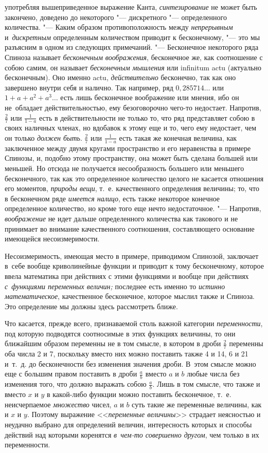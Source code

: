 употребляя вышеприведенное выражение Канта, {\em синтезирование} не может быть
закончено, доведено до некоторого "--- дискретного "--- определенного
количества. "--- Каким образом противоположность между {\em непрерывным}
и~{\em дискретным} определенным количеством приводит к бесконечному, "--- это
мы разъясним в одном из следующих примечаний. "--- Бесконечное некоторого ряда
Спиноза называет {\em бесконечным воображения}, бесконечное же, как соотношение
с собою самим, он называет {\em бесконечным мышления} или infinitum actu
(актуально бесконечным). Оно именно actu, {\em действительно} бесконечно, так
как оно завершено внутри себя и налично. Так например, ряд $0{,}285714\ldots$
или $1+a+a^2+a^3\ldots$ есть лишь бесконечное воображение или мнения, ибо он
не~обладает действительностью, ему безоговорочно чего-то недостает. Напротив,
$\frac 2 7$ или $\frac 1{1-a}$ есть в действительности не только то, что ряд
представляет собою в своих наличных членах, но вдобавок к этому еще и то, чего
ему недостает, чем он только {\em должен быть}. $\frac 2 7$ или $\frac 1{1-a}$
есть такая же конечная величина, как заключенное между двумя кругами
пространство и его неравенства в примере Спинозы, и, подобно этому
пространству, она может быть сделана большей или меньшей. Но отсюда не
получается несообразность большего или меньшего бесконечного, так как это
определенное количество целого не касается отношения его моментов, {\em природы
вещи}, т.~е. качественного определения величины; то, что в бесконечном ряде
{\em имеется налицо}, есть также некоторое конечное определенное количество,
но кроме того еще нечто недостаточное. "--- Напротив, {\em воображение} не идет
дальше определенного количества как такового и не принимает во внимание
качественного соотношения, составляющего основание имеющейся несоизмеримости.

Несоизмеримость, имеющая место в примере, приводимом Спинозой, заключает в~себе
вообще криволинейные функции и приводит к тому бесконечному, которое ввела
математика при действиях с этими функциями и вообще при действиях
{\em с~функциями переменных величин;} последнее есть именно то
{\em истинно математическое}, качественное бесконечное, которое мыслил
также и Спиноза. Это определение мы должны здесь рассмотреть ближе.

Что касается, прежде всего, признаваемой столь важной категории
{\em переменности}, под которую подводятся соотносимые в этих функциях
величины, то они ближайшим образом переменны не в том смысле, в котором в дроби
$\frac 2 7$ переменны оба числа 2 и 7, поскольку вместо них можно поставить
также 4 и 14, 6 и 21 и~т.~д. до бесконечности без изменения значения дроби.
В~этом смысле можно еще с большим правом поставить в дроби $\frac a b$ вместо
$a$ и $b$ любые числа без изменения того, что должно выражать собою
$\frac a b$. Лишь в том смысле, что также и вместо $x$ и $y$ в какой-либо
функции можно поставить бесконечное, т.~е. неисчерпаемое {\em множество} чисел,
$a$ и $b$ суть такие же переменные величины, как и $x$ и $y$. Поэтому выражение
<<{\em переменные величины}>> страдает неясностью и неудачно выбрано для
определений величин, интересность которых и способы действий над которыми
коренятся {\em в~чем-то совершенно другом}, чем только в их переменности.

